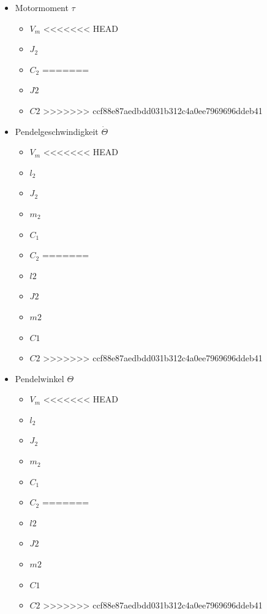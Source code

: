 \begin{minipage}[t]{.5\textwidth}
    \begin{itemize}
    \item Motormoment $\tau$
    \begin{itemize}
        \item $V_m$
<<<<<<< HEAD
        \item $J_2$
        \item $C_2$
=======
        \item $J2$
        \item $C2$
>>>>>>> ccf88e87aedbdd031b312c4a0ee7969696ddeb41
    \end{itemize}
    \item Pendelgeschwindigkeit $\dot\Theta$
    \begin{itemize}
        \item $V_m$
<<<<<<< HEAD
        \item $l_2$
        \item $J_2$
        \item $m_2$
        \item $C_1$
        \item $C_2$
=======
        \item $l2$
        \item $J2$
        \item $m2$
        \item $C1$
        \item $C2$
>>>>>>> ccf88e87aedbdd031b312c4a0ee7969696ddeb41
    \end{itemize}
    \item Pendelwinkel $\Theta$
    \begin{itemize}
        \item $V_m$
<<<<<<< HEAD
        \item $l_2$
        \item $J_2$
        \item $m_2$
        \item $C_1$
        \item $C_2$ 
=======
        \item $l2$
        \item $J2$
        \item $m2$
        \item $C1$
        \item $C2$ 
>>>>>>> ccf88e87aedbdd031b312c4a0ee7969696ddeb41
    \end{itemize}
\end{itemize}
\end{minipage}

